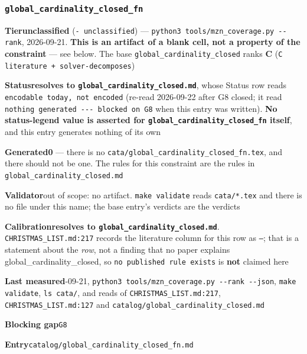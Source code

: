 \documentclass[10pt,a4paper]{article}
\newcommand{\entryfield}[2]{{\raggedright\textbf{#1}\quad #2\par}}
\begin{document}
\subsubsection*{\texttt{global\_\allowbreak{}cardinality\_\allowbreak{}closed\_\allowbreak{}fn}}
\label{entry:global-cardinality-closed-fn}
\entryfield{Tier}{\textbf{unclassified} (\texttt{- unclassified}) --- \texttt{python3 tools/\allowbreak{}mzn\_\allowbreak{}coverage.\allowbreak{}py -\allowbreak{}-\allowbreak{}rank}, 2026-09-21. \textbf{This is an artifact of a blank cell, not a property of the constraint} --- see below. The base \texttt{global\_\allowbreak{}cardinality\_\allowbreak{}closed} ranks \textbf{C} (\texttt{C literature + solver-\allowbreak{}decomposes})}
\entryfield{Status}{\textbf{resolves to \texttt{global\_\allowbreak{}cardinality\_\allowbreak{}closed.\allowbreak{}md}}, whose Status row reads \texttt{encodable today, not encoded} (re-read 2026-09-22 after G8 closed; it read \texttt{nothing generated -\allowbreak{}-\allowbreak{}-\allowbreak{} blocked on G8} when this entry was written). \textbf{No status-legend value is asserted for \texttt{global\_\allowbreak{}cardinality\_\allowbreak{}closed\_\allowbreak{}fn} itself}, and this entry generates nothing of its own}
\entryfield{Generated}{\textbf{0} --- there is no \texttt{cata/\allowbreak{}global\_\allowbreak{}cardinality\_\allowbreak{}closed\_\allowbreak{}fn.\allowbreak{}tex}, and there should not be one. The rules for this constraint are the rules in \texttt{global\_\allowbreak{}cardinality\_\allowbreak{}closed.\allowbreak{}md}}
\entryfield{Validator}{out of scope: no artifact. \texttt{make validate} reads \texttt{cata/*.tex} and there is no file under this name; the base entry's verdicts are the verdicts}
\entryfield{Calibration}{\textbf{resolves to \texttt{global\_\allowbreak{}cardinality\_\allowbreak{}closed.\allowbreak{}md}}. \texttt{CHRISTMAS\_LIST.md:217} records the literature column for this row as \texttt{---}; that is a statement about the \emph{row}, not a finding that no paper explains global\_cardinality\_closed, so \texttt{no published rule exists} is \textbf{not} claimed here}
\entryfield{Last measured}{2026-09-21, \texttt{python3 tools/\allowbreak{}mzn\_\allowbreak{}coverage.\allowbreak{}py -\allowbreak{}-\allowbreak{}rank -\allowbreak{}-\allowbreak{}json}, \texttt{make validate}, \texttt{ls cata/}, and reads of \texttt{CHRISTMAS\_LIST.md:217}, \texttt{CHRISTMAS\_LIST.md:127} and \texttt{catalog/\allowbreak{}global\_\allowbreak{}cardinality\_\allowbreak{}closed.\allowbreak{}md}}
\entryfield{Blocking gap}{\texttt{G8}}
\entryfield{Entry}{\texttt{catalog/global\_cardinality\_closed\_fn.md}}
\end{document}
